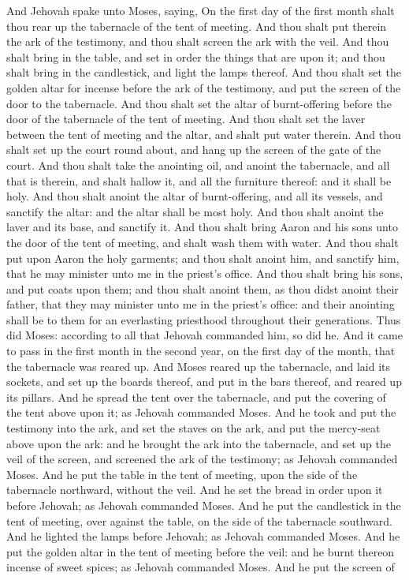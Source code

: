 And Jehovah spake unto Moses, saying, On the first day of the first month shalt thou rear up the tabernacle of the tent of meeting. And thou shalt put therein the ark of the testimony, and thou shalt screen the ark with the veil. And thou shalt bring in the table, and set in order the things that are upon it; and thou shalt bring in the candlestick, and light the lamps thereof. And thou shalt set the golden altar for incense before the ark of the testimony, and put the screen of the door to the tabernacle. And thou shalt set the altar of burnt-offering before the door of the tabernacle of the tent of meeting. And thou shalt set the laver between the tent of meeting and the altar, and shalt put water therein. And thou shalt set up the court round about, and hang up the screen of the gate of the court. And thou shalt take the anointing oil, and anoint the tabernacle, and all that is therein, and shalt hallow it, and all the furniture thereof: and it shall be holy. And thou shalt anoint the altar of burnt-offering, and all its vessels, and sanctify the altar: and the altar shall be most holy. And thou shalt anoint the laver and its base, and sanctify it. And thou shalt bring Aaron and his sons unto the door of the tent of meeting, and shalt wash them with water. And thou shalt put upon Aaron the holy garments; and thou shalt anoint him, and sanctify him, that he may minister unto me in the priest’s office. And thou shalt bring his sons, and put coats upon them; and thou shalt anoint them, as thou didst anoint their father, that they may minister unto me in the priest’s office: and their anointing shall be to them for an everlasting priesthood throughout their generations. Thus did Moses: according to all that Jehovah commanded him, so did he.  And it came to pass in the first month in the second year, on the first day of the month, that the tabernacle was reared up. And Moses reared up the tabernacle, and laid its sockets, and set up the boards thereof, and put in the bars thereof, and reared up its pillars. And he spread the tent over the tabernacle, and put the covering of the tent above upon it; as Jehovah commanded Moses. And he took and put the testimony into the ark, and set the staves on the ark, and put the mercy-seat above upon the ark: and he brought the ark into the tabernacle, and set up the veil of the screen, and screened the ark of the testimony; as Jehovah commanded Moses. And he put the table in the tent of meeting, upon the side of the tabernacle northward, without the veil. And he set the bread in order upon it before Jehovah; as Jehovah commanded Moses. And he put the candlestick in the tent of meeting, over against the table, on the side of the tabernacle southward. And he lighted the lamps before Jehovah; as Jehovah commanded Moses. And he put the golden altar in the tent of meeting before the veil: and he burnt thereon incense of sweet spices; as Jehovah commanded Moses. And he put the screen of 